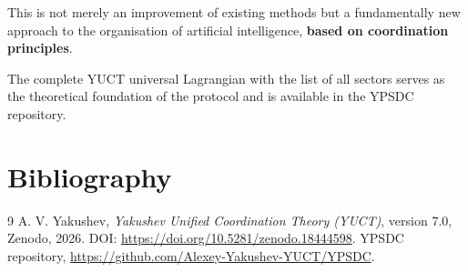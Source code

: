 \documentclass[12pt,a4paper]{article}
\begin{document}
	This is not merely an improvement of existing methods but a fundamentally new approach to the organisation of artificial intelligence, \textbf{based on coordination principles}.
	
	The complete YUCT universal Lagrangian with the list of all sectors serves as the theoretical foundation of the protocol and is available in the YPSDC repository.
	
	\section*{Bibliography}
	\begin{thebibliography}{9}
		A. V. Yakushev, \emph{Yakushev Unified Coordination Theory (YUCT)}, version 7.0, Zenodo, 2026. DOI: \url{https://doi.org/10.5281/zenodo.18444598}.
		YPSDC repository, \url{https://github.com/Alexey-Yakushev-YUCT/YPSDC}.
	\end{thebibliography}
	
\end{document}

